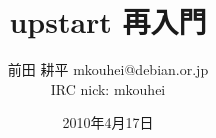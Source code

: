 




\documentclass[cjk,dvipdfmx,12pt]{beamer}
\usepackage{monthlypresentation}


\title{upstart 再入門}
\subtitle{}
\author{前田 耕平 mkouhei@debian.or.jp\\IRC nick: mkouhei}
\date{2010年4月17日}



